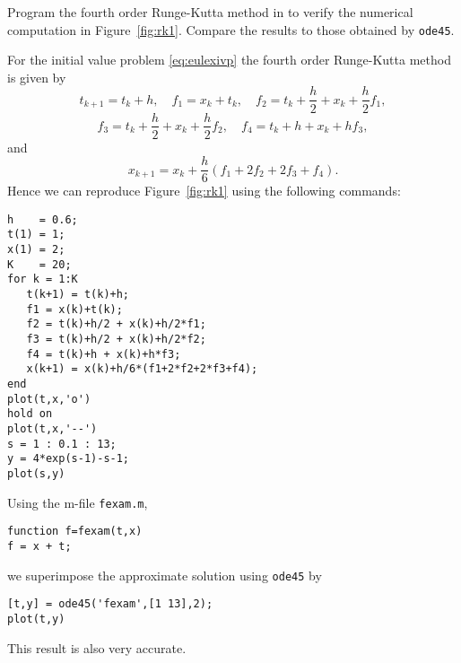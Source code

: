 \documentclass{ximera}
\begin{document}
\begin{exercise} \label{c15.1.8}
Program the fourth order Runge-Kutta method in \Matlab
to verify the numerical computation in Figure~\ref{fig:rk1}.
Compare the results to those obtained by {\tt ode45}.

\begin{solution}
For the initial value problem \eqref{eq:eulexivp} the
fourth order Runge-Kutta method is given by
\[
t_{k+1} = t_k+h,\quad f_1= x_k + t_k,\quad
f_2 = t_k+\frac{h}{2} + x_k + \frac{h}{2}f_1,
\]
\[
f_3 = t_k+\frac{h}{2} + x_k + \frac{h}{2}f_2,\quad f_4 = t_k+h+x_k+hf_3,
\]
and
\[
x_{k+1} = x_k + \frac{h}{6}(f_1+2f_2+2f_3+f_4).
\]
Hence we can reproduce Figure~\ref{fig:rk1} using the following
\Matlab commands:
\begin{verbatim}
h    = 0.6;
t(1) = 1;
x(1) = 2;
K    = 20;
for k = 1:K
   t(k+1) = t(k)+h;
   f1 = x(k)+t(k);
   f2 = t(k)+h/2 + x(k)+h/2*f1;
   f3 = t(k)+h/2 + x(k)+h/2*f2;
   f4 = t(k)+h + x(k)+h*f3;
   x(k+1) = x(k)+h/6*(f1+2*f2+2*f3+f4);
end
plot(t,x,'o')
hold on
plot(t,x,'--')
s = 1 : 0.1 : 13;
y = 4*exp(s-1)-s-1;
plot(s,y)
\end{verbatim}
Using the m-file {\tt fexam.m},
\begin{verbatim}
function f=fexam(t,x)
f = x + t;
\end{verbatim}
we superimpose the approximate solution using {\tt ode45} by
\begin{verbatim}
[t,y] = ode45('fexam',[1 13],2);
plot(t,y)
\end{verbatim}
This result is also very accurate.

\end{solution}
\end{exercise}
\end{document}
